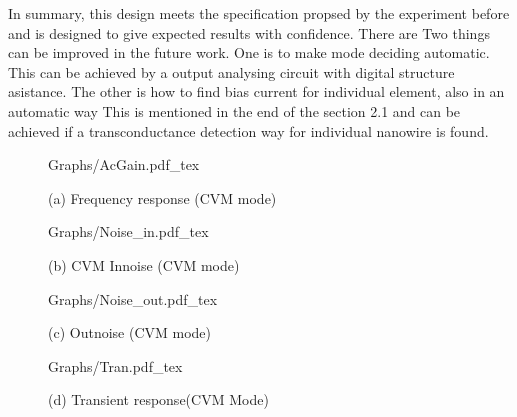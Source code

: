 \documentclass{article}
\begin{document}
In summary, this design meets the specification propsed by the experiment before and is designed to give expected results with confidence.
There are Two things can be improved in the future work.
One is to make mode deciding automatic.
This can be achieved by a output analysing circuit with digital structure asistance.
The other is how to find bias current for individual element, also in an automatic way
This is mentioned in the end of the section 2.1 and can be achieved if a transconductance detection way for individual nanowire is found.






\begin{figure}[!hb]
    \begin{minipage}[b]{1\linewidth}
        \centering
        \def\svgwidth{8cm}
        \fontsize{6}{8}\selectfont
         {Graphs/AcGain.pdf_tex}
        \fontsize{8}{10}\selectfont
        \centerline{(a) Frequency response (CVM mode)}\medskip
    \end{minipage}


    \begin{minipage}[!htb]{0.5\linewidth}
        \centering
        \def\svgwidth{4cm}
        \fontsize{6}{8}\selectfont
         {Graphs/Noise_in.pdf_tex}
        \fontsize{8}{10}\selectfont
        \centerline{(b) CVM Innoise (CVM mode) }\medskip
    \end{minipage}
    \hfill
    \begin{minipage}[!htb]{0.5\linewidth}
        \centering
        \def\svgwidth{5.1cm}
        \fontsize{6}{8}\selectfont
         {Graphs/Noise_out.pdf_tex}
        \fontsize{8}{10}\selectfont
        \centerline{(c) Outnoise (CVM mode) }\medskip
    \end{minipage}

    \begin{minipage}[!hb]{1\linewidth}
        \centering
        \def\svgwidth{9cm}
        \fontsize{4}{6}\selectfont
         {Graphs/Tran.pdf_tex}
        \fontsize{8}{10}\selectfont
        \centerline{(d) Transient response(CVM Mode) }\medskip
    \end{minipage}
    \caption{}
    \label{fig:res}
\end{figure}
\end{document}
